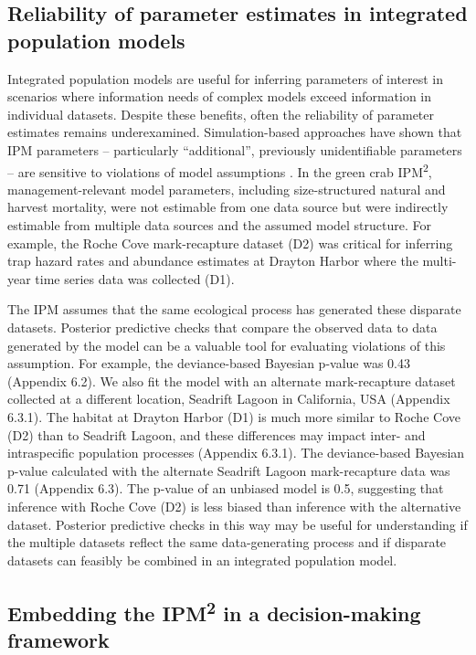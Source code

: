 \documentclass{article}
\begin{document}
\subsection{Reliability of parameter estimates in integrated population models}

Integrated population models are useful for inferring parameters of interest in scenarios where information needs of complex models exceed information in individual datasets. Despite these benefits, often the reliability of parameter estimates remains underexamined. Simulation-based approaches have shown that IPM parameters -- particularly “additional”, previously unidentifiable parameters -- are sensitive to violations of model assumptions \parencite{riecke2019integrated}. In the green crab IPM\textsuperscript{2}, management-relevant model parameters, including size-structured natural and harvest mortality, were not estimable from one data source but were indirectly estimable from multiple data sources and the assumed model structure. For example, the Roche Cove mark-recapture dataset (D2) was critical for inferring trap hazard rates and abundance estimates at Drayton Harbor where the multi-year time series data was collected (D1).

The IPM assumes that the same ecological process has generated these disparate datasets. Posterior predictive checks that compare the observed data to data generated by the model can be a valuable tool for evaluating violations of this assumption. For example, the deviance-based Bayesian p-value was 0.43 (Appendix 6.2). We also fit the model with an alternate mark-recapture dataset collected at a different location, Seadrift Lagoon in California, USA (Appendix 6.3.1). The habitat at Drayton Harbor (D1) is much more similar to Roche Cove (D2) than to Seadrift Lagoon, and these differences may impact inter- and intraspecific population processes (Appendix 6.3.1). The deviance-based Bayesian p-value calculated with the alternate Seadrift Lagoon mark-recapture data was 0.71 (Appendix 6.3). The p-value of an unbiased model is 0.5, suggesting that inference with Roche Cove (D2) is less biased than inference with the alternative dataset. Posterior predictive checks in this way may be useful for understanding if the multiple datasets reflect the same data-generating process and if disparate datasets can feasibly be combined in an integrated population model. 

\subsection{Embedding the IPM\textsuperscript{2} in a decision-making framework}
\end{document}
